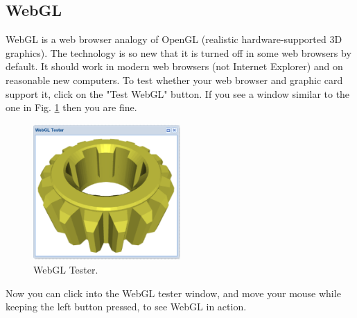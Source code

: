 \documentclass[article,A4,12pt]{llncs}
\begin{document}
\subsection{WebGL}

WebGL is a web browser analogy of OpenGL (realistic hardware-supported 3D graphics). 
The technology is so new that it is 
turned off in some web browsers by default. It should work in modern web browsers 
(not Internet Explorer) and on reasonable new computers. To test whether your web 
browser and graphic card support it,  
click on the "Test WebGL" button. If you see a window 
similar to the one in Fig. \ref{fig:webgl2} then you are fine. 

\begin{figure}[!ht]
\begin{center}
\includegraphics[width=0.5\textwidth]{img/webgl2.png}
\end{center}
\vspace{-2mm}
\caption{WebGL Tester.}
\label{fig:webgl2}
\end{figure}
\noindent
Now you can click into the WebGL tester window, and move 
your mouse while keeping the left button pressed, to see WebGL in action.
\end{document}
